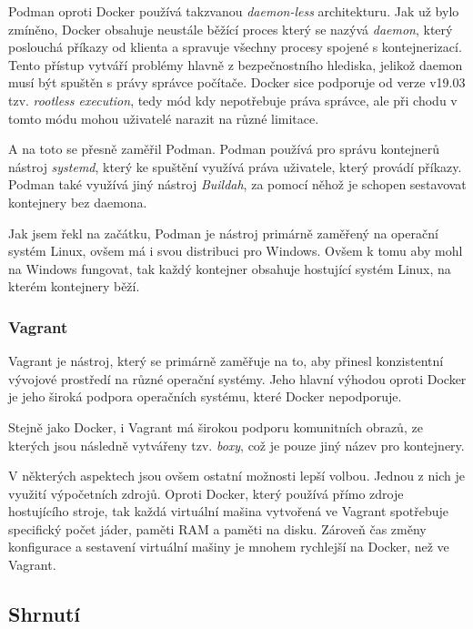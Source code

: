 Podman oproti Docker používá takzvanou \textit{daemon-less} architekturu. Jak už bylo zmíněno, Docker obsahuje neustále běžící proces který se nazývá \textit{daemon}, který poslouchá příkazy od klienta a spravuje všechny procesy spojené s kontejnerizací. Tento přístup vytváří problémy hlavně z bezpečnostního hlediska, jelikož daemon musí být spuštěn s právy správce počítače. Docker sice podporuje od verze v19.03 tzv. \textit{rootless execution}, tedy mód kdy nepotřebuje práva správce, ale při chodu v tomto módu mohou uživatelé narazit na různé limitace.

A na toto se přesně zaměřil Podman. Podman používá pro správu kontejnerů nástroj \textit{systemd}, který ke spuštění využívá práva uživatele, který provádí příkazy. Podman také využívá jiný nástroj \textit{Buildah}, za pomocí něhož je schopen sestavovat kontejnery bez daemona. 

Jak jsem řekl na začátku, Podman je nástroj primárně zaměřený na operační systém Linux, ovšem má i svou distribuci pro Windows. Ovšem k tomu aby mohl na Windows fungovat, tak každý kontejner obsahuje hostující systém Linux, na kterém kontejnery běží. \cite{podman}\cite{podman_vs_docker}

\subsubsection{Vagrant}

Vagrant je nástroj, který se primárně zaměřuje na to, aby přinesl konzistentní vývojové prostředí na různé operační systémy. Jeho hlavní výhodou oproti Docker je jeho široká podpora operačních systému, které Docker nepodporuje. 

Stejně jako Docker, i Vagrant má širokou podporu komunitních obrazů, ze kterých jsou následně vytvářeny tzv. \textit{boxy}, což je pouze jiný název pro kontejnery.\cite{vargrant_vs_docker}

V některých aspektech jsou ovšem ostatní možnosti lepší volbou. Jednou z nich je využití výpočetních zdrojů. Oproti Docker, který používá přímo zdroje hostujícího stroje, tak každá virtuální mašina vytvořená ve Vagrant spotřebuje specifický počet jáder, paměti RAM a paměti na disku. Zároveň čas změny konfigurace a sestavení virtuální mašiny je mnohem rychlejší na Docker, než ve Vagrant.\cite{madapparambath_2022}

\subsection{Shrnutí}

